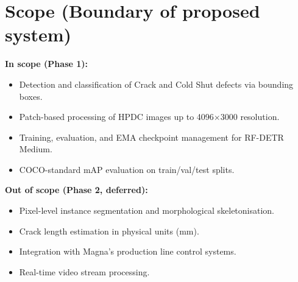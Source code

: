 \section{Scope (Boundary of proposed system)}
\justify

\textbf{In scope (Phase 1):}
\begin{itemize}[leftmargin=2em]
    \item Detection and classification of Crack and Cold Shut defects via bounding boxes.
    \item Patch-based processing of HPDC images up to 4096$\times$3000 resolution.
    \item Training, evaluation, and EMA checkpoint management for RF-DETR Medium.
    \item COCO-standard mAP evaluation on train/val/test splits.
\end{itemize}

\textbf{Out of scope (Phase 2, deferred):}
\begin{itemize}[leftmargin=2em]
    \item Pixel-level instance segmentation and morphological skeletonisation.
    \item Crack length estimation in physical units (mm).
    \item Integration with Magna's production line control systems.
    \item Real-time video stream processing.
\end{itemize}
